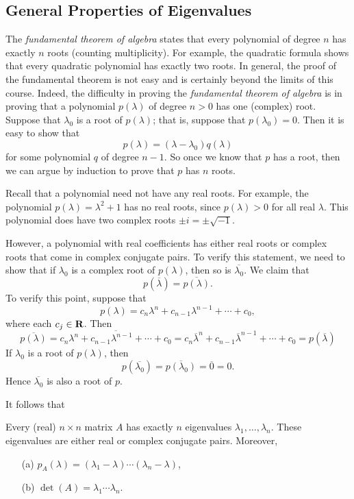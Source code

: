 \subsection*{General Properties of Eigenvalues}

The {\em fundamental theorem of algebra\/}  states that every polynomial of degree $n$
has exactly $n$ roots (counting multiplicity).  For example, the 
quadratic formula shows that 
every quadratic polynomial has exactly two roots.  In general, the proof 
of the fundamental theorem is not easy and is certainly beyond the 
limits of this course.  Indeed, the difficulty in proving the {\em
fundamental theorem of algebra\/} is in proving that a
polynomial $p(\lambda)$ of degree $n>0$ has one (complex) root.
Suppose that $\lambda_0$ is a root of $p(\lambda)$; that is,
suppose that $p(\lambda_0)=0$. Then it is easy to show that
\begin{equation}  \label{e:factoring}
p(\lambda) = (\lambda-\lambda_0)q(\lambda)
\end{equation}
for some polynomial $q$ of degree $n-1$.  So once we know that
$p$ has a root, then we can argue by induction to prove that $p$
has $n$ roots.  

Recall that a polynomial need not have any real roots. For
example, the polynomial $p(\lambda)=\lambda^2+1$ has no real
roots, since $p(\lambda)> 0$ for all real $\lambda$.  This
polynomial does have two complex roots $\pm i =\pm\sqrt{-1}$.  

However, a polynomial with real coefficients has either real
roots or complex roots that come in complex conjugate pairs.  To
verify this statement, we need to show that if $\lambda_0$ is a
complex root of $p(\lambda)$, then so is $\overline{\lambda_0}$.
We claim that 
\[
p(\overline{\lambda})=\overline{p(\lambda)}.
\]
To verify this point, suppose that
\[
p(\lambda) = c_n\lambda^n + c_{n-1}\lambda^{n-1} + \cdots + c_0,
\]
where each $c_j\in\mbox{$\bf{R}$}$.  Then
\[
\overline{p(\lambda)}
=\overline{c_n\lambda^n + c_{n-1}\lambda^{n-1} + \cdots + c_0} 
= c_n\overline{\lambda}^n + c_{n-1}\overline{\lambda}^{n-1} + \cdots + c_0
= p(\overline{\lambda})
\]
If $\lambda_0$ is a root of $p(\lambda)$, then
\[
p(\overline{\lambda_0}) = \overline{p(\lambda_0)}=\overline{0}=0.
\]
Hence $\overline{\lambda_0}$ is also a root of $p$.

It follows that 
\begin{thm}  \label{T:eigens}
Every (real) $n\times n$ matrix $A$ has exactly $n$ eigenvalues
$\lambda_1,\ldots,\lambda_n$.  These eigenvalues are either real
or complex conjugate pairs.  Moreover,
\begin{enumerate}
\item[(a)] $p_A(\lambda) = (\lambda_1-\lambda)\cdots(\lambda_n-\lambda)$,
\item[(b)] $\det(A) = \lambda_1\cdots\lambda_n$.
\end{enumerate}
\end{thm} 

